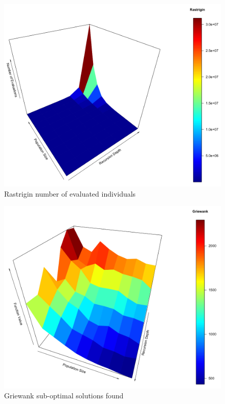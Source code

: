 \documentclass[graybox]{styles/svmult}
\begin{document}
\begin{figure}[b]
\sidecaption
\includegraphics[width=1.0\textwidth,height=0.45\textheight]{images/fig05}
\caption{Rastrigin number of evaluated individuals}
\label{fig:12}
\end{figure}

\begin{figure}[b]
\sidecaption
\includegraphics[width=1.0\textwidth,height=0.45\textheight]{images/fig06}
\caption{Griewank sub-optimal solutions found}
\label{fig:13}
\end{figure}
\end{document}

